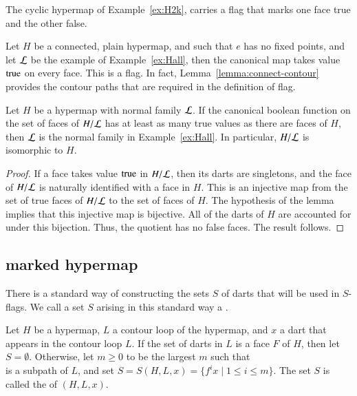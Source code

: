 \begin{example} The cyclic hypermap of Example~\ref{ex:H2k}, carries a
flag that marks one face true and the other false.
\end{example}

\begin{example}\label{ex:Hall-flag} 
Let $H$ be a connected, plain hypermap, and such that
$e$ has no fixed points, and let $\cal L$ be the example of
Example~\ref{ex:Hall}, then the canonical map takes value
${\operatorname{true}}$ on every face.  This is a flag. In fact,
Lemma~\ref{lemma:connect-contour} provides the contour paths that
are required in the definition of flag.
\end{example}

\begin{lemma}  
Let $H$ be a hypermap with normal family ${\cal L}$. If the
canonical boolean function on the set of faces of $H/{\cal L}$ has
at least as many true values as there are faces of $H$, then $\cal
L$ is the normal family in Example~\ref{ex:Hall}. In particular,
$H/{\cal L}$ is isomorphic to $H$.
\end{lemma}

\begin{proof} If a face takes value ${\operatorname{true}}$ in $H/{\cal L}$, then
its darts are singletons, and the face of $H/{\cal L}$ is naturally
identified with a face in $H$.  This is an injective map from the
set of true faces of $H/{\cal L}$ to the set of faces of $H$.  The
hypothesis of the lemma implies that this injective map is
bijective. All of the darts of $H$ are accounted for under this
bijection. Thus, the quotient has no false faces.  The result
follows.
\end{proof}


\subsection{marked hypermap}\label{sec:face-insert}
%



There is a standard way of constructing the sets $S$ of darts that
will be used in $S$-flags.  We call a set $S$ arising in this
standard way a .

\begin{definition}
Let $H$ be a hypermap, $L$ a contour loop of the hypermap,
and $x$ a dart that appears in the contour loop $L$.
If the set of darts in $L$ is a face $F$ of $H$, then let $S=\emptyset$.
Otherwise,
let $m\ge0$ to be the largest $m$ 
such that 
\begin{displaymath}
[x;f x; f^2 x;\ldots;f^{m+1} x]
\end{displaymath}  
is a subpath of $L$, and
set $S = S(H,L,x) = \{f^i x \mid 1 \le i\le m\}$.
The set $S$ is called the  of $(H,L,x)$.
\end{definition}

